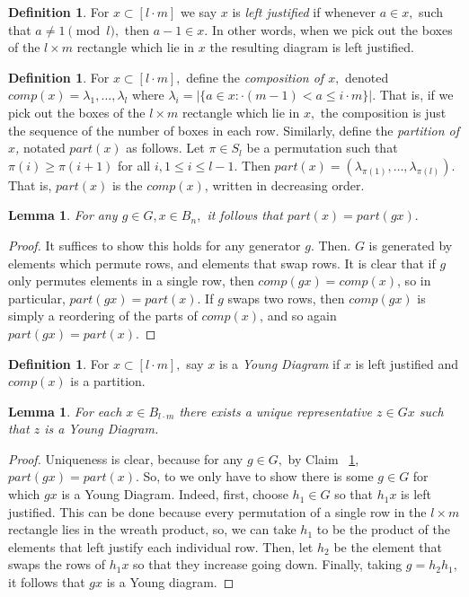 \documentclass[10 pt]{amsart}
\theoremstyle{plain}
\newtheorem{lem}[thm]{Lemma}
\theoremstyle{definition}
\newtheorem{defn}[thm]{Definition}
\theoremstyle{remark}
\numberwithin{equation}{section}
\begin{document}
\begin{defn}
For $x \subset [l \cdot m]$ we say $x$ is {\it left justified} if whenever $a \in x,$ such that $a \neq 1 \pmod l,$ then $a -1 \in x.$ In other words, when we pick out the boxes of the $l\times m$ rectangle which lie in $x$ the resulting diagram is left justified.
\end{defn}

\begin{defn}
For $x \subset [l\cdot m],$ define the {\it composition of $x,$} denoted $comp(x) = \lambda_1 ,\ldots, \lambda_l$ where $\lambda_i = |\{a \in x\colon\cdot (m-1)< a \leq i \cdot m\}|.$ That is, if we pick out the boxes of the $l \times m$ rectangle which lie in $x,$ the composition is just the sequence of the number of boxes in each row. Similarly, define the {\it partition of $x$,} notated $part(x)$ as follows. Let $\pi \in S_l$ be a permutation such that $\pi(i) \geq \pi(i+1)$ for all $i,1\leq i \leq l-1.$ Then  $part(x) = (\lambda_{\pi(1)},\ldots, \lambda_{\pi(l)}).$ That is, $part(x)$ is the $comp(x)$, written in decreasing order.
\end{defn}

\begin{lem}
\label{lem:comp_invariance}
For any $g \in G, x \in B_n,$ it follows that $part(x) = part(gx).$
\end{lem}
\begin{proof}
It suffices to show this holds for any generator $g.$ Then. $G$ is generated by elements which permute rows, and elements that swap rows. It is clear that if $g$ only permutes elements in a single row, then $comp(gx) = comp(x)$, so in particular, $part(gx) = part(x).$ If $g$ swaps two rows, then $comp(gx)$ is simply a reordering of the parts of $comp(x)$, and so again $part(gx) = part(x).$
\end{proof}

\begin{defn}
For $x \subset [l\cdot m],$ say $x$ is a {\it Young Diagram} if $x$ is left justified and $comp(x)$ is a partition.
\end{defn}

\begin{lem}
\label{lem:young_diag_reps}
For each $x \in B_{l\cdot m}$ there exists a unique representative $z \in Gx$ such that $z$ is a Young Diagram.
\end{lem}
\begin{proof}
Uniqueness is clear, because for any $g \in G,$ by Claim ~\ref{lem:comp_invariance}, $part(gx) = part(x).$ So, to we only have to show there is some $g \in G$ for which $gx$ is a Young Diagram. Indeed, first, choose $h_1 \in G$ so that $h_1x$ is left justified. This can be done because every permutation of a single row in the $l\times m$ rectangle lies in the wreath product, so, we can take $h_1$ to be the product of the elements that left justify each individual row. Then, let $h_2$ be the element that swaps the rows of $h_1x$ so that they increase going down. Finally, taking $g = h_2 h_1,$ it follows that $gx$ is a Young diagram. 
\end{proof}
\end{document}
